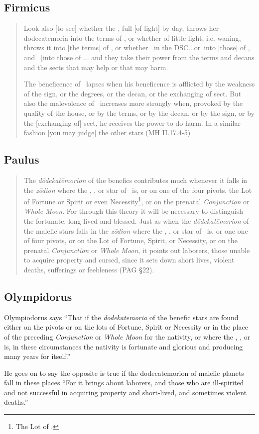 \subsection{Firmicus}
\begin{quote}
Look also [to see] whether the \Moon, full [of light] by day, throws her dodecatemoria into the terms of \Mars, or whether of little light, i.e. waning, throws it into [the terms] of \Saturn, or whether \Mars\, in the DSC...or\Venus\, into [those] of \Mars, and \Mars\, [into those of \Venus... and they take their power from the terms and decans and the sects that may help or that may harm.

The beneficence of \Jupiter\, lapses when his beneficence is afflicted by the weakness of the sign, or the degrees, or the decan, or the exchanging of sect. But also the malevolence of \Saturn\, increases more strongly when, provoked by the quality of the house, or by the terms, or by the decan, or by the sign, or by the [exchanging of] sect, he receives the power to do harm. In a similar fashion [you may judge] the other stars (MH II.17.4-5)
\end{quote}

\subsection{Paulus}
\begin{quote}
The \textsl{d\=odekat\=emorion} of the benefics contributes much whenever it falls in the \textsl{z\=odion} where the \Sun, \Moon, or star of \Mercury\, is, or on one of the four pivots, the Lot of Fortune or Spirit or even Necessity\footnote{The Lot of \Mercury.}, or on the prenatal \textsl{Conjunction} or \textsl{Whole Moon}. For through this theory it will be necessary to distinguish the fortunate, long-lived and blessed. Just as when the \textsl{d\=odekat\=emorion} of the malefic stars falls in the \textsl{z\=odion} where the \Sun, \Moon, or star of \Mercury\, is, or one one of four pivots, or on the Lot of Fortune, Spirit, or Necessity, or on the prenatal \textsl{Conjunction} or \textsl{Whole Moon}, it points out laborers, those unable to acquire property and cursed, since it sets down short lives, violent deaths, sufferings or feebleness (PAG \S22).
\end{quote}

\subsection{Olympidorus}
Olympiodorus says ``That if the \textsl{d\={o}dekat\={e}moria} of the benefic stars are found either on the pivots or on the lots of Fortune, Spirit or Necessity or in the place of the preceding \textsl{Conjunction} or \textsl{Whole Moon} for the nativity, or where the \Sun, \Moon, or \Mercury\, is, in these circumstances the nativity is fortunate and glorious and producing many years for itself.''

He goes on to say the opposite is true if the dodecatemorion of malefic planets fall in these places ``For it brings about laborers, and those who are ill-spirited and not successful in acquiring property and short-lived, and sometimes violent deaths.'' 
